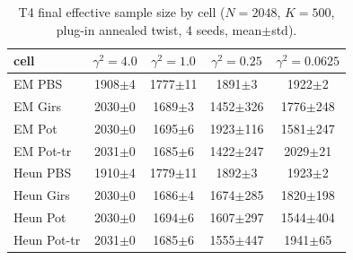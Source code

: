 \begin{table}[ht]
\centering
\caption{T4 final effective sample size by cell ($N=2048$, $K=500$, plug-in annealed twist, 4 seeds, mean$\pm$std).}
\label{tab:toy_t4_ess}
\begin{tabular}{lcccc}
\toprule
cell & $\gamma^2=4.0$ & $\gamma^2=1.0$ & $\gamma^2=0.25$ & $\gamma^2=0.0625$ \\
\midrule
EM PBS & 1908$\pm$4 & 1777$\pm$11 & 1891$\pm$3 & 1922$\pm$2 \\
EM Girs & 2030$\pm$0 & 1689$\pm$3 & 1452$\pm$326 & 1776$\pm$248 \\
EM Pot & 2030$\pm$0 & 1695$\pm$6 & 1923$\pm$116 & 1581$\pm$247 \\
EM Pot-tr & 2031$\pm$0 & 1685$\pm$6 & 1422$\pm$247 & 2029$\pm$21 \\
Heun PBS & 1910$\pm$4 & 1779$\pm$11 & 1892$\pm$3 & 1923$\pm$2 \\
Heun Girs & 2030$\pm$0 & 1686$\pm$4 & 1674$\pm$285 & 1820$\pm$198 \\
Heun Pot & 2030$\pm$0 & 1694$\pm$6 & 1607$\pm$297 & 1544$\pm$404 \\
Heun Pot-tr & 2031$\pm$0 & 1685$\pm$6 & 1555$\pm$447 & 1941$\pm$65 \\
\bottomrule
\end{tabular}
\end{table}

